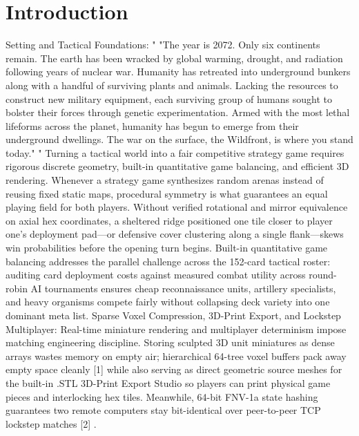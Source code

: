 \documentclass[10pt,letterpaper]{article}
\begin{document}
\section{Introduction}
Setting and Tactical Foundations: " "The year is 2072. Only six continents remain. The earth has been wracked by global warming, drought, and radiation following years of nuclear war. Humanity has retreated into underground bunkers along with a handful of surviving plants and animals. Lacking the resources to construct new military equipment, each surviving group of humans sought to bolster their forces through genetic experimentation. Armed with the most lethal lifeforms across the planet, humanity has begun to emerge from their underground dwellings. The war on the surface, the Wildfront, is where you stand today." " Turning a tactical world into a fair competitive strategy game requires rigorous discrete geometry, built-in quantitative game balancing, and efficient 3D rendering. Whenever a strategy game synthesizes random arenas instead of reusing fixed static maps, procedural symmetry is what guarantees an equal playing field for both players. Without verified rotational and mirror equivalence on axial hex coordinates, a sheltered ridge positioned one tile closer to player one's deployment pad---or defensive cover clustering along a single flank---skews win probabilities before the opening turn begins. Built-in quantitative game balancing addresses the parallel challenge across the 152-card tactical roster: auditing card deployment costs against measured combat utility across round-robin AI tournaments ensures cheap reconnaissance units, artillery specialists, and heavy organisms compete fairly without collapsing deck variety into one dominant meta list. Sparse Voxel Compression, 3D-Print Export, and Lockstep Multiplayer: Real-time miniature rendering and multiplayer determinism impose matching engineering discipline. Storing sculpted 3D unit miniatures as dense arrays wastes memory on empty air; hierarchical 64-tree voxel buffers pack away empty space cleanly [1] while also serving as direct geometric source meshes for the built-in .STL 3D-Print Export Studio so players can print physical game pieces and interlocking hex tiles. Meanwhile, 64-bit FNV-1a state hashing guarantees two remote computers stay bit-identical over peer-to-peer TCP lockstep matches [2] .
\end{document}
